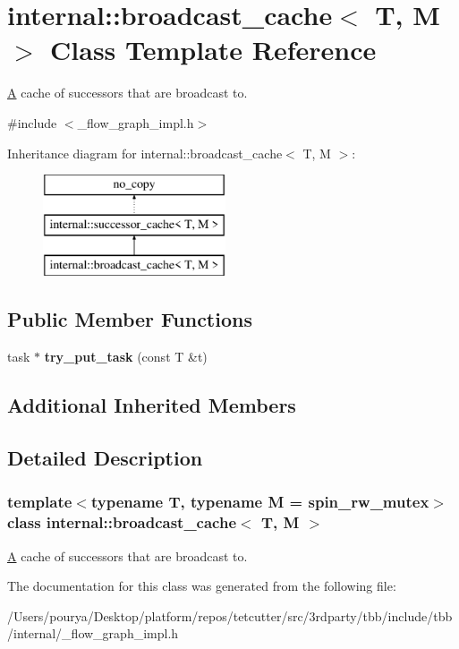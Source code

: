 \hypertarget{classinternal_1_1broadcast__cache}{}\section{internal\+:\+:broadcast\+\_\+cache$<$ T, M $>$ Class Template Reference}
\label{classinternal_1_1broadcast__cache}


\hyperlink{structA}{A} cache of successors that are broadcast to.  




{\ttfamily \#include $<$\+\_\+flow\+\_\+graph\+\_\+impl.\+h$>$}

Inheritance diagram for internal\+:\+:broadcast\+\_\+cache$<$ T, M $>$\+:\begin{figure}[H]
\begin{center}
\leavevmode
\includegraphics[height=3.000000cm]{classinternal_1_1broadcast__cache}
\end{center}
\end{figure}
\subsection*{Public Member Functions}
\begin{DoxyCompactItemize}
\item 
\hypertarget{classinternal_1_1broadcast__cache_a05d56829b4c3b970325c8b8bfb68a6e1}{}task $\ast$ {\bfseries try\+\_\+put\+\_\+task} (const T \&t)\label{classinternal_1_1broadcast__cache_a05d56829b4c3b970325c8b8bfb68a6e1}

\end{DoxyCompactItemize}
\subsection*{Additional Inherited Members}


\subsection{Detailed Description}
\subsubsection*{template$<$typename T, typename M = spin\+\_\+rw\+\_\+mutex$>$class internal\+::broadcast\+\_\+cache$<$ T, M $>$}

\hyperlink{structA}{A} cache of successors that are broadcast to. 

The documentation for this class was generated from the following file\+:\begin{DoxyCompactItemize}
\item 
/\+Users/pourya/\+Desktop/platform/repos/tetcutter/src/3rdparty/tbb/include/tbb/internal/\+\_\+flow\+\_\+graph\+\_\+impl.\+h\end{DoxyCompactItemize}

